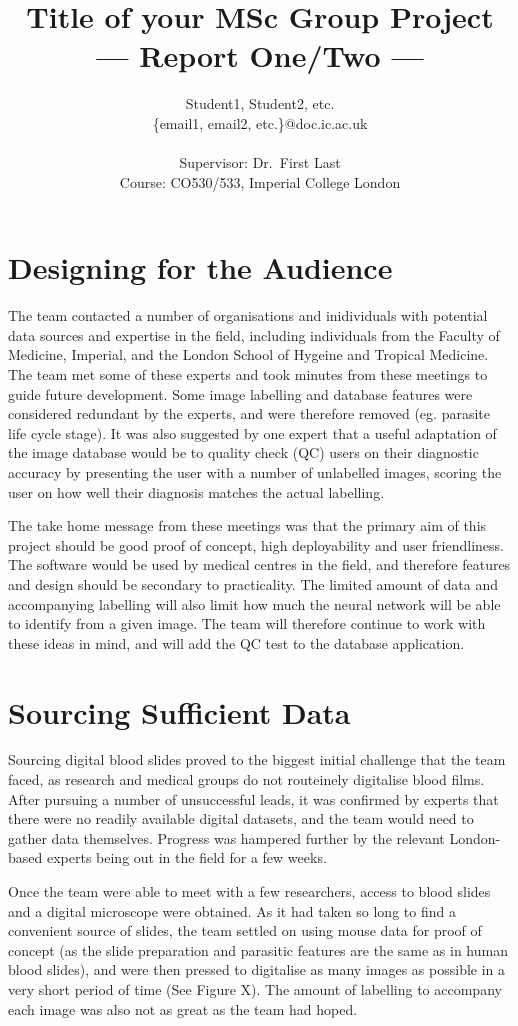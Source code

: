 \documentclass[a4paper,11pt]{article}
\title{Title of your MSc Group Project\\\Large{--- Report One/Two ---}}
\author{Student1, Student2, etc.\\
       \{email1, email2, etc.\}@doc.ic.ac.uk\\ \\
      \small{Supervisor: Dr.\ First Last}\\
     \small{Course: CO530/533, Imperial College London}
}
\begin{document}
\section{Designing for the Audience}
The team contacted a number of organisations and inidividuals with potential data sources and expertise in the field, including individuals from the Faculty of Medicine, Imperial, and the London School of Hygeine and Tropical Medicine. The team met some of these experts and took minutes from these meetings to guide future development. Some image labelling and database features were considered redundant by the experts, and were therefore removed (eg. parasite life cycle stage). It was also suggested by one expert that a useful adaptation of the image database would be to quality check (QC) users on their diagnostic accuracy by presenting the user with a number of unlabelled images, scoring the user on how well their diagnosis matches the actual labelling. 

The take home message from these meetings was that the primary aim of this project should be good proof of concept, high deployability and user friendliness. The software would be used by medical centres in the field, and therefore features and design should be secondary to practicality. The limited amount of data and accompanying labelling will also limit how much the neural network will be able to identify from a given image. The team will therefore continue to work with these ideas in mind, and will add the QC test to the database application.


\section{Sourcing Sufficient Data}
Sourcing digital blood slides proved to the biggest initial challenge that the team faced, as research and medical groups do not routeinely digitalise blood films. After pursuing a number of unsuccessful leads, it was confirmed by experts that there were no readily available digital datasets, and the team would need to gather data themselves. Progress was hampered further by the relevant London-based experts being out in the field for a few weeks.

Once the team were able to meet with a few researchers, access to blood slides and a digital microscope were obtained. As it had taken so long to find a convenient source of slides, the team settled on using mouse data for proof of concept (as the slide preparation and parasitic features are the same as in human blood slides), and were then pressed to digitalise as many images as possible in a very short period of time (See Figure X). The amount of labelling to accompany each image was also not as great as the team had hoped. 
\end{document}
